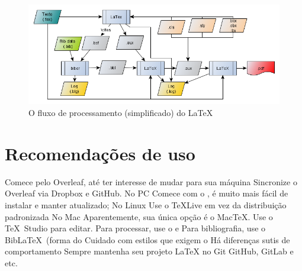 \begin{figure}[hbt]
    \centering
    \includegraphics[width=0.8\linewidth]{"Images/LaTeX processing flow"}
    \caption{O fluxo de processamento (simplificado) do \LaTeX}
    \label{fig:latex-processing-flow}
\end{figure}

\section{Recomendações de uso}

    \begin{outline}
    \1 Comece pelo Overleaf, até ter interesse de mudar para sua máquina
    \1 Sincronize o Overleaf via Dropbox e GitHub. 
    \1 No PC
    \2 Comece com o , é muito mais fácil de instalar e manter
    atualizado;
    \1 No Linux
    \2 Use o \TeX  Live em vez da distribuição padronizada
    \1 No Mac
    \2 Aparentemente, sua única opção é o Mac\TeX.
    \1 Use o \TeX\ Studio para editar.
    \1 Para processar, use o  e 
    \1 Para bibliografia, use o Bib\LaTeX\ (forma do  
    \2 Cuidado com estilos que exigem o 
    \2 Há diferenças sutis de comportamento
    \1 Sempre mantenha seu projeto \LaTeX{}  no Git
    \2 GitHub, GitLab e etc.
\end{outline}

